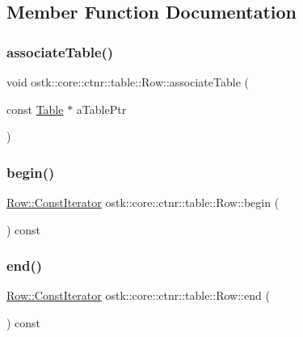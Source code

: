 \subsection{Member Function Documentation}
\mbox{\label{classostk_1_1core_1_1ctnr_1_1table_1_1_row_a9ac16652d96ec69bf674d607f928bb3f}} 
\subsubsection{\texorpdfstring{associate\+Table()}{associateTable()}}
{\footnotesize\ttfamily void ostk\+::core\+::ctnr\+::table\+::\+Row\+::associate\+Table (\begin{DoxyParamCaption}\item[{const \hyperlink{classostk_1_1core_1_1ctnr_1_1_table}{Table} $\ast$}]{a\+Table\+Ptr }\end{DoxyParamCaption})}

\mbox{\label{classostk_1_1core_1_1ctnr_1_1table_1_1_row_a9a6c41ee47d716cb5c20c75156669a47}} 
\subsubsection{\texorpdfstring{begin()}{begin()}}
{\footnotesize\ttfamily \hyperlink{classostk_1_1core_1_1ctnr_1_1table_1_1_row_af1eb8276a850652cbeb4ee3575aa7db3}{Row\+::\+Const\+Iterator} ostk\+::core\+::ctnr\+::table\+::\+Row\+::begin (\begin{DoxyParamCaption}{ }\end{DoxyParamCaption}) const}

\mbox{\label{classostk_1_1core_1_1ctnr_1_1table_1_1_row_a53825178dba964bc80876b0518483ce0}} 
\subsubsection{\texorpdfstring{end()}{end()}}
{\footnotesize\ttfamily \hyperlink{classostk_1_1core_1_1ctnr_1_1table_1_1_row_af1eb8276a850652cbeb4ee3575aa7db3}{Row\+::\+Const\+Iterator} ostk\+::core\+::ctnr\+::table\+::\+Row\+::end (\begin{DoxyParamCaption}{ }\end{DoxyParamCaption}) const}

